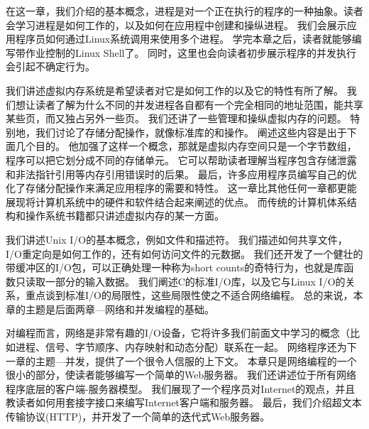 {{\begin{description}
{                在这一章，我们介绍的基本概念，进程是对一个正在执行的程序的一种抽象。读者会学习进程是如何工作的，以及如何在应用程中创建和操纵进程。
                我们会展示应用程序员如何通过Linux系统调用来使用多个进程。
                学完本章之后，读者就能够编写带作业控制的Linux Shell了。
                同时，这里也会向读者初步展示程序的并发执行会引起不确定行为。
            }
            \item[第9章：虚拟内存]
            {
                我们讲述虚拟内存系统是希望读者对它是如何工作的以及它的特性有所了解。
                我们想让读者了解为什么不同的并发进程各自都有一个完全相同的地址范围，能共享某些页，而又独占另外一些页。
                我们还讲了一些管理和操纵虚拟内存的问题。
                特别地，我们讨论了存储分配操作，就像标准库的和操作。
                阐述这些内容是出于下面几个目的。
                他加强了这样一个概念，那就是虚拟内存空间只是一个字节数组，程序可以把它划分成不同的存储单元。
                它可以帮助读者理解当程序包含存储泄露和非法指针引用等内存引用错误时的后果。
                最后，许多应用程序员编写自己的优化了存储分配操作来满足应用程序的需要和特性。
                这一章比其他任何一章都更能展现将计算机系统中的硬件和软件结合起来阐述的优点。
                而传统的计算机体系结构和操作系统书籍都只讲述虚拟内存的某一方面。
            }
            \item[第10章：系统级I/O]
            {
                我们讲述Unix I/O的基本概念，例如文件和描述符。
                我们描述如何共享文件，I/O重定向是如何工作的，还有如何访问文件的元数据。
                我们还开发了一个健壮的带缓冲区的I/O包，可以正确处理一种称为short counts的奇特行为，也就是库函数只读取一部分的输入数据。
                我们阐述C的标准I/O库，以及它与Linux I/O的关系，重点谈到标准I/O的局限性，这些局限性使之不适合网络编程。
                总的来说，本章的主题是后面两章---网络和并发编程的基础。
            }
            \item[第11章：网络编程]
            {
                对编程而言，网络是非常有趣的I/O设备，它将许多我们前面文中学习的概念（比如进程、信号、字节顺序、内存映射和动态分配）联系在一起。
                网络程序还为下一章的主题---并发，提供了一个很令人信服的上下文。
                本章只是网络编程的一个很小的部分，使读者能够编写一个简单的Web服务器。
                我们还讲述位于所有网络程序底层的客户端-服务器模型。
                我们展现了一个程序员对Internet的观点，并且教读者如何用套接字接口来编写Internet客户端和服务器。
                最后，我们介绍超文本传输协议(HTTP)，并开发了一个简单的迭代式Web服务器。
}
\end{description}}}
